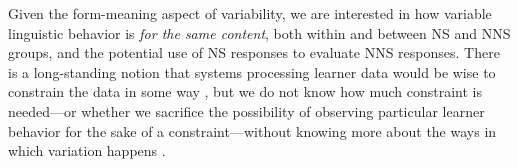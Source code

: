 \documentclass[11pt,a4paper]{article}
\begin{document}
Given the form-meaning aspect of variability, we are interested in how variable linguistic behavior is \emph{for the same content}, both within and between NS and NNS groups, and the potential use of NS responses to evaluate NNS responses.  There is a long-standing notion that systems processing learner data would be wise to constrain the data in some way \citep[e.g.,][]{heift:schulze:07, somasundaran:ea:15}, but we do not know how much constraint is needed---or whether we sacrifice the possibility of observing particular learner behavior for the sake of a constraint---without knowing more about the ways in which variation happens \citep[cf., in particular,][]{bailey:meurers:08}.  

%
%
%
%
%
%
\end{document}
